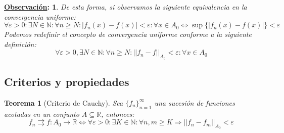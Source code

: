 \documentclass[10pt,a4paper,openright]{book}
\theoremstyle{break}
\newtheorem*{theo}{Teorema}
\newtheorem*{obs}{\underline{Observación}:}
\begin{document}
\begin{obs}
De esta forma, si observamos la siguiente equivalencia en la convergencia uniforme:
$$\forall \varepsilon> 0: \exists N\in \mathbb N: \forall n\geq N : |f_n(x)-f(x)|<\varepsilon : \forall x \in A_0 \Leftrightarrow \sup \{|f_n(x)-f(x)|\}<\varepsilon$$
Podemos redefinir el concepto de convergencia uniforme conforme a la siguiente definición:
$$\forall \varepsilon > 0, \exists N \in \mathbb{N} : \forall n \geq N : ||f_n - f|| _{A_0}< \varepsilon : \forall x \in A_0 $$
\end{obs}

\subsection{Criterios y propiedades}
\begin{theo}[Criterio de Cauchy]
Sea $\{f_n\}_{n=1}^\infty$ una sucesión de funciones acotadas en un conjunto $A\subseteq \mathbb R$, entonces:
$$f_n\rightrightarrows f: A_0\rightarrow \mathbb R \Leftrightarrow \forall \varepsilon > 0: \exists K \in \mathbb N: \forall n,m\geq K\Rightarrow ||f_n-f_m||_{A_0}<\varepsilon$$
\end{theo}
\end{document}
